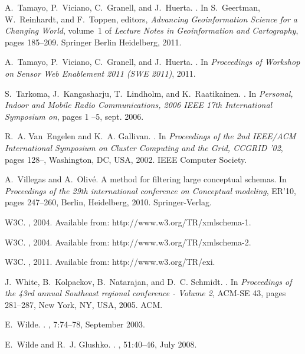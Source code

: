 \documentclass{sig-alternate}
\begin{document}
\begin{thebibliography}{10}
  \balancecolumns

A.~Tamayo, P.~Viciano, C.~Granell, and J.~Huerta.
.
\newblock In S.~Geertman, W.~Reinhardt, and F.~Toppen, editors, {\em Advancing
  Geoinformation Science for a Changing World}, volume~1 of {\em Lecture Notes
  in Geoinformation and Cartography}, pages 185--209. Springer Berlin
  Heidelberg, 2011.

A.~Tamayo, P.~Viciano, C.~Granell, and J.~Huerta.
.
\newblock In {\em Proceedings of Workshop on Sensor Web Enablement 2011 (SWE
  2011)}, 2011.

S.~Tarkoma, J.~Kangasharju, T.~Lindholm, and K.~Raatikainen.
.
\newblock In {\em Personal, Indoor and Mobile Radio Communications, 2006 IEEE
  17th International Symposium on}, pages 1 --5, sept. 2006.

R.~A. Van~Engelen and K.~A. Gallivan.
.
\newblock In {\em Proceedings of the 2nd IEEE/ACM International Symposium on
  Cluster Computing and the Grid, CCGRID '02}, pages 128--, Washington, DC,
  USA, 2002. IEEE Computer Society.

A.~Villegas and A.~Oliv\'{e}.
\newblock A method for filtering large conceptual schemas.
\newblock In {\em Proceedings of the 29th international conference on
  Conceptual modeling}, ER'10, pages 247--260, Berlin, Heidelberg, 2010.
  Springer-Verlag.

W3C.
, 2004.
\newblock Available from: http://www.w3.org/TR/xmlschema-1.

W3C.
, 2004.
\newblock Available from: http://www.w3.org/TR/xmlschema-2.

W3C.
, 2011.
\newblock Available from: http://www.w3.org/TR/exi.

J.~White, B.~Kolpackov, B.~Natarajan, and D.~C. Schmidt.
.
\newblock In {\em Proceedings of the 43rd annual Southeast regional conference
  - Volume 2}, ACM-SE 43, pages 281--287, New York, NY, USA, 2005. ACM.

E.~Wilde.
.
, 7:74--78, September 2003.

E.~Wilde and R.~J. Glushko.
.
, 51:40--46, July 2008.

\end{thebibliography}
\end{document}
